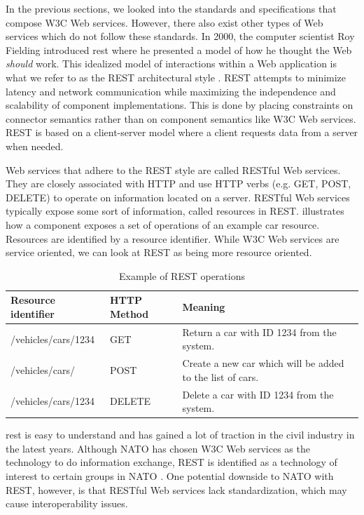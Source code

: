 In the previous sections, we looked into the standards and specifications that
compose W3C Web services. However, there also exist other types of Web services
which do not follow these standards. In 2000, the computer scientist Roy
Fielding introduced \gls{rest} where he presented a model of how he thought the
Web \textit{should} work. This idealized model of interactions within a Web
application is what we refer to as the REST architectural style
\cite{rest-fielding}. REST attempts to minimize latency and network
communication while maximizing the independence and scalability of component
implementations. This is done by placing constraints on connector semantics
rather than on component semantics like W3C Web services.  REST is based on a
client-server model where a client requests data from a server when needed.

Web services that adhere to the REST style are called RESTful Web services. They
are closely associated with HTTP and use HTTP verbs (e.g. GET, POST, DELETE) to
operate on information located on a server. RESTful Web services typically
expose some sort of information, called resources in REST. 
illustrates how a component exposes a set of operations of an example car
resource. Resources are identified by a resource identifier. While W3C Web
services are service oriented, we can look at REST as being more resource
oriented.

 \begin{table}[h]
 \begin{tabularx}{\textwidth}{| X | X | X |}
 \hline
   \textbf{Resource identifier} & \textbf{HTTP Method}  & \textbf{Meaning}\\ \hline
   /vehicles/cars/1234 & GET & Return a car with ID 1234 from the system. \\ \hline
   /vehicles/cars/ & POST & Create a new car which will be added to the list of cars. \\ \hline
   /vehicles/cars/1234 & DELETE & Delete a car with ID 1234 from the system. \\ \hline
 \end{tabularx}
 \caption{Example of REST operations}
 \label{table-rest}
 \end{table}

 \gls{rest} is easy to understand and has gained a lot of traction in the civil
 industry in the latest years. Although NATO has chosen W3C Web services as the
 technology to do information exchange, REST is identified as a technology of
 interest to certain groups in NATO \cite{johnsen-recommendations}. One potential
 downside to NATO with REST, however, is that RESTful Web services lack
 standardization, which may cause interoperability issues.


